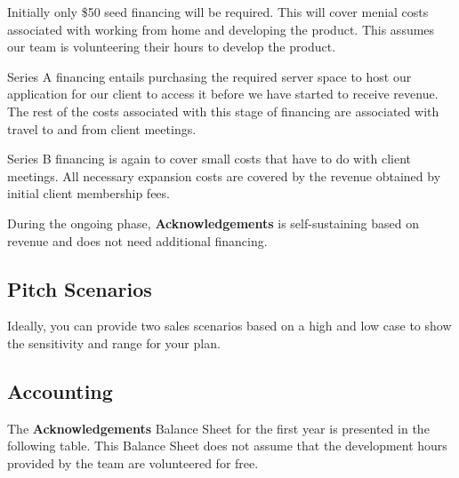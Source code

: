Initially only \$50 seed financing will be required. This will cover menial costs associated with working from home and developing the product. This assumes our team is volunteering their hours to develop the product.

Series A financing entails purchasing the required server space to host our application for our client to access it before we have started to receive revenue. The rest of the costs associated with this stage of financing are associated with travel to and from client meetings.

Series B financing is again to cover small costs that have to do with client meetings. All necessary expansion costs are covered by the revenue obtained by initial client membership fees.

During the ongoing phase, {\bf Acknowledgements} is self-sustaining based on revenue and does not need additional financing.

\subsection{Pitch Scenarios}
Ideally, you can provide two sales scenarios
based on a high and low case to show the sensitivity and range for your plan.

\subsection{Accounting}
The {\bf Acknowledgements} Balance Sheet for the first year is presented in the following table. This Balance Sheet does not assume that the development hours provided by the team are volunteered for free.

